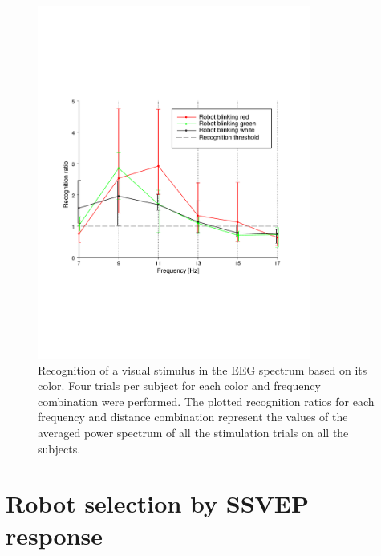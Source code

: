 \documentclass[smallextended]{svjour3}
\begin{document}
\begin{figure}
\center
\includegraphics[width=0.8\textwidth]{figures/graph-couleurs.pdf}
\caption{Recognition of a visual stimulus in the EEG spectrum based on its color. Four trials per subject for each color and frequency combination were performed. The plotted recognition ratios for each frequency and distance combination represent the values of the averaged power spectrum of all the stimulation trials on all the subjects.} \label{fig:graph-couleurs}
\end{figure}

\section{Robot selection by SSVEP response}
\label{sec:CCA_approach}
\end{document}
